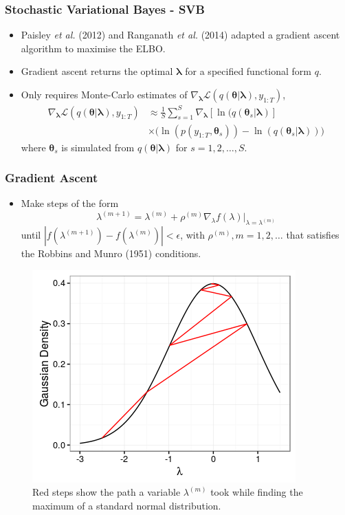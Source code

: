 \documentclass{beamer}\usepackage[]{graphicx}\usepackage[]{color}
\begin{document}
\begin{frame}
\frametitle{Stochastic Variational Bayes - SVB}
\begin{itemize}
\item Paisley \textit{et al.} (2012) and Ranganath \textit{et al.} (2014) adapted a gradient ascent algorithm to maximise the ELBO.
\item Gradient ascent returns the optimal $\boldsymbol{\lambda}$ for a specified functional form $q$.
\item Only requires Monte-Carlo estimates of $\nabla_{\boldsymbol{\lambda}}\mathcal{L}(q(\boldsymbol{\theta} | \boldsymbol{\lambda}), y_{1:T})$,
\begin{align}
\label{SVB}
\nabla_{\boldsymbol{\lambda}}\mathcal{L}(q(\boldsymbol{\theta} | \boldsymbol{\lambda}), y_{1:T}) &\approx \frac{1}{S}\sum_{s=1}^{S} \nabla_{\boldsymbol{\lambda}} [\ln(q(\boldsymbol{\theta}_s | \boldsymbol{\lambda})] \nonumber \\
&\times \big(\ln (p(y_{1:T}, \boldsymbol{\theta}_s)) - \ln(q(\boldsymbol{\theta}_s | \boldsymbol{\lambda}))\big) 
\end{align}
where $\boldsymbol{\theta}_s$ is simulated from $q(\boldsymbol{\theta} | \boldsymbol{\lambda})$ for $s = 1, 2, \dots, S$. 
\end{itemize}
\end{frame}


\begin{frame}
\frametitle{Gradient Ascent}
\begin{itemize}
\item Make steps of the form
\begin{equation}
\lambda^{(m+1)} = \lambda^{(m)} + \rho^{(m)} \nabla_{\lambda} f(\lambda) \bigg|_{\lambda = \lambda^{(m)}}
\end{equation}
until $| f(\lambda^{(m+1)}) - f(\lambda^{(m)}) | < \epsilon$, with $\rho^{(m)}, m = 1, 2, \dots$ that satisfies the Robbins and Munro (1951) conditions.
\end{itemize}
\begin{figure}[h]
\centering
\includegraphics[scale = 0.4]{gradientascent}
\caption{Red steps show the path a variable $\lambda^{(m)}$ took while finding the maximum of a standard normal distribution.}
\label{fig:GradAscent}
\end{figure}
\end{frame}
\end{document}

